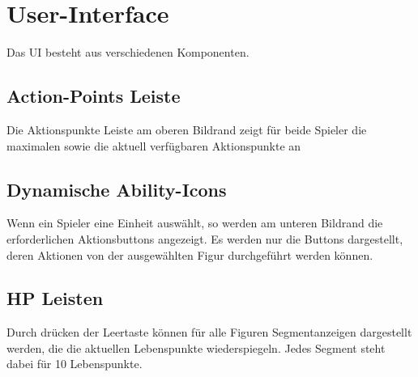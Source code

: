 \chapter{User-Interface}
Das UI besteht aus verschiedenen Komponenten.

\section{Action-Points Leiste}
Die Aktionspunkte Leiste am oberen Bildrand zeigt für beide Spieler die maximalen sowie die aktuell verfügbaren Aktionspunkte an

\section{Dynamische Ability-Icons}
Wenn ein Spieler eine Einheit auswählt, so werden am unteren Bildrand die erforderlichen Aktionsbuttons angezeigt. Es werden nur die Buttons dargestellt, deren Aktionen von der ausgewählten Figur durchgeführt werden können. 

\section{HP Leisten}
Durch drücken der Leertaste können für alle Figuren Segmentanzeigen dargestellt werden, die die aktuellen Lebenspunkte wiederspiegeln. Jedes Segment steht dabei für 10 Lebenspunkte.
